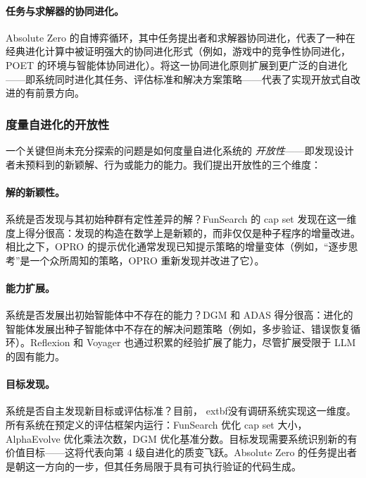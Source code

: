 \paragraph{任务与求解器的协同进化。}
Absolute Zero 的自博弈循环，其中任务提出者和求解器协同进化，代表了一种在经典进化计算中被证明强大的协同进化形式（例如，游戏中的竞争性协同进化，POET 的环境与智能体协同进化）。将这一协同进化原则扩展到更广泛的自进化——即系统同时进化其任务、评估标准和解决方案策略——代表了实现开放式自改进的有前景方向。


\subsubsection{度量自进化的开放性}

一个关键但尚未充分探索的问题是如何度量自进化系统的 \emph{开放性}——即发现设计者未预料到的新颖解、行为或能力的能力。我们提出开放性的三个维度：

\paragraph{解的新颖性。}
系统是否发现与其初始种群有定性差异的解？FunSearch 的 cap set 发现在这一维度上得分很高：发现的构造在数学上是新颖的，而非仅仅是种子程序的增量改进。相比之下，OPRO 的提示优化通常发现已知提示策略的增量变体（例如，``逐步思考''是一个众所周知的策略，OPRO 重新发现并改进了它）。

\paragraph{能力扩展。}
系统是否发展出初始智能体中不存在的能力？DGM 和 ADAS 得分很高：进化的智能体发展出种子智能体中不存在的解决问题策略（例如，多步验证、错误恢复循环）。Reflexion 和 Voyager 也通过积累的经验扩展了能力，尽管扩展受限于 LLM 的固有能力。

\paragraph{目标发现。}
系统是否自主发现新目标或评估标准？目前，	extbf{没有调研系统}实现这一维度。所有系统在预定义的评估框架内运行：FunSearch 优化 cap set 大小，AlphaEvolve 优化乘法次数，DGM 优化基准分数。目标发现需要系统识别新的有价值目标——这将代表向第 4 级自进化的质变飞跃。Absolute Zero 的任务提出者是朝这一方向的一步，但其任务局限于具有可执行验证的代码生成。

